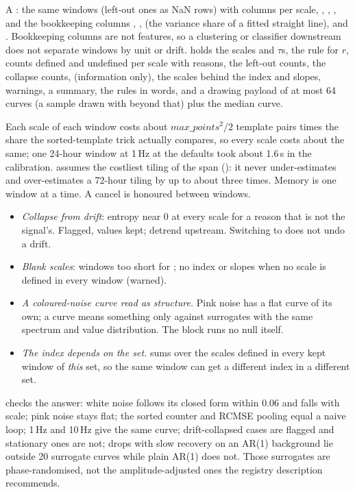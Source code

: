 A : the same windows (left-out ones as NaN rows) with columns
 per scale, , ,
, and the bookkeeping columns , ,
 (the variance share of a fitted straight line), 
and . Bookkeeping columns are not features, so a clustering or
classifier downstream does not separate windows by unit or drift.  holds the
scales and $\tau$s, the rule for $r$, counts defined and undefined per scale with reasons,
the left-out counts, the collapse counts,  (information only), the scales
behind the index and slopes, warnings, a summary, the rules in words, and a drawing payload
of at most 64 curves (a sample drawn with  beyond that) plus the median curve.

Each scale of each window costs about $\mathit{max\_points}^2/2$ template pairs times the
share the sorted-template trick actually compares, so every scale costs about the same; one
24-hour window at 1\,Hz at the defaults took about 1.6\,s in the calibration. 
assumes the costliest tiling of the span (): it never under-estimates
and over-estimates a 72-hour tiling by up to about three times. Memory is one window at a
time. A cancel is honoured between windows.

\begin{itemize}
\item \emph{Collapse from drift}: entropy near 0 at every scale for a reason that is not the
  signal's. Flagged, values kept; detrend upstream. Switching  to 
  does not undo a drift.
\item \emph{Blank scales}: windows too short for ; no index or slopes when
  no scale is defined in every window (warned).
\item \emph{A coloured-noise curve read as structure.} Pink noise has a flat curve of its
  own; a curve means something only against surrogates with the same spectrum and value
  distribution. The block runs no null itself.
\item \emph{The index depends on the set.}  sums over the scales defined in
  every kept window of \emph{this} set, so the same window can get a different index in a
  different set.
\end{itemize}

 checks the answer: white noise follows its closed
form within 0.06 and falls with scale; pink noise stays flat; the sorted counter and RCMSE
pooling equal a naive loop; 1\,Hz and 10\,Hz give the same curve; drift-collapsed cases are
flagged and stationary ones are not; drops with slow recovery on an AR(1) background lie
outside 20 surrogate curves while plain AR(1) does not. Those surrogates are
phase-randomised, not the amplitude-adjusted ones the registry description recommends.

